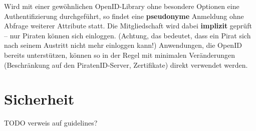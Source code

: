 Wird mit einer gewöhnlichen OpenID-Library ohne besondere Optionen eine Authentifizierung durchgeführt,
so findet eine \textbf{pseudonyme} Anmeldung ohne Abfrage weiterer Attribute statt.
Die Mitgliedschaft wird dabei \textbf{implizit} geprüft -- nur Piraten können sich einloggen.
(Achtung, das bedeutet, dass ein Pirat sich nach seinem Austritt nicht mehr einloggen kann!)
Anwendungen, die OpenID bereits unterstützen, können so in der Regel mit minimalen Veränderungen (Beschränkung auf den PiratenID-Server, Zertifikate) direkt verwendet werden.


\newpage
\section{Sicherheit}

TODO verweis auf guidelines?

